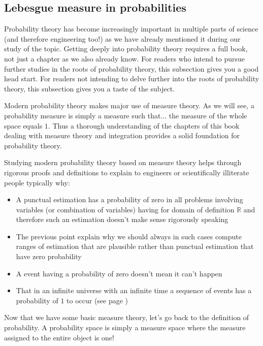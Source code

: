 		\subsection{Lebesgue measure in probabilities}
	Probability theory has become increasingly important in multiple parts of science (and therefore engineering too!) as we have already mentioned it during our study of the topic. Getting deeply into probability theory requires a full book, not just a chapter as we also already know. For readers who intend to pursue further studies in the roots of probability theory, this subsection gives you a good head start. For readers not intending to delve further into the roots of probability theory, this subsection gives you a taste of the subject.

	Modern probability theory makes major use of measure theory. As we will see, a probability measure is simply a measure such that... the measure of the whole space equals $1$. Thus a thorough understanding of the chapters of this book dealing with measure theory and integration provides a solid foundation for probability theory.

	Studying modern probability theory based on measure theory helps through rigorous proofs and definitions to explain to engineers or scientifically illiterate people typically why:
	\begin{itemize}
		\item A punctual estimation has a probability of zero in all problems involving variables (or combination of variables) having for domain of definition $\mathbb{R}$ and therefore such an estimation doesn't make sense rigorously speaking
	
		\item The previous point explain why we should always in such cases compute ranges of estimation that are plausible rather than punctual estimation that have zero probability
		
		\item A event having a probability of zero doesn't mean it can't happen
		
		\item That in an infinite universe with an infinite time a sequence of events has a probability of $1$ to occur (see page \pageref{Borel law})
	\end{itemize}
	
	Now that we have some basic measure theory, let’s go back to the definition of probability. A probability space is simply a measure space where the measure assigned to the entire object is one!

